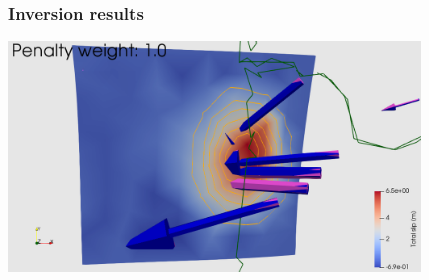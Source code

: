 \documentclass{beamer}
\begin{document}
\begin{frame}
  \frametitle{Inversion results}

  \vfill
  \begin{center}
    \includegraphics[height=6.1cm]{figs/subduction3d_step07_inverse_soln}
  \end{center}
  \vfill
  
\end{frame}

\end{document}
